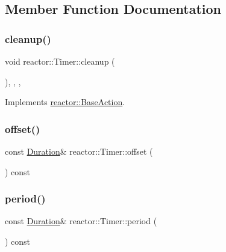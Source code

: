 \subsection{Member Function Documentation}
\mbox{\label{classreactor_1_1Timer_ab01356b0c99de6a3bd9f46bfd0ce1c7b}} 
\subsubsection{\texorpdfstring{cleanup()}{cleanup()}}
{\footnotesize\ttfamily void reactor\+::\+Timer\+::cleanup (\begin{DoxyParamCaption}{ }\end{DoxyParamCaption})\hspace{0.3cm}{\ttfamily [final]}, {\ttfamily [override]}, {\ttfamily [private]}, {\ttfamily [virtual]}}



Implements \hyperlink{classreactor_1_1BaseAction_a7e4ad7157e653054c7afa22b78e46923}{reactor\+::\+Base\+Action}.

\mbox{\label{classreactor_1_1Timer_ad88516bbbba6a4380bae74af76611640}} 
\subsubsection{\texorpdfstring{offset()}{offset()}}
{\footnotesize\ttfamily const \hyperlink{namespacereactor_aa8375b807a80703545664096c5b5b779}{Duration}\& reactor\+::\+Timer\+::offset (\begin{DoxyParamCaption}{ }\end{DoxyParamCaption}) const\hspace{0.3cm}{\ttfamily [inline]}}

\mbox{\label{classreactor_1_1Timer_a618e80997d7d4881df1b9e9190dae82d}} 
\subsubsection{\texorpdfstring{period()}{period()}}
{\footnotesize\ttfamily const \hyperlink{namespacereactor_aa8375b807a80703545664096c5b5b779}{Duration}\& reactor\+::\+Timer\+::period (\begin{DoxyParamCaption}{ }\end{DoxyParamCaption}) const\hspace{0.3cm}{\ttfamily [inline]}}

